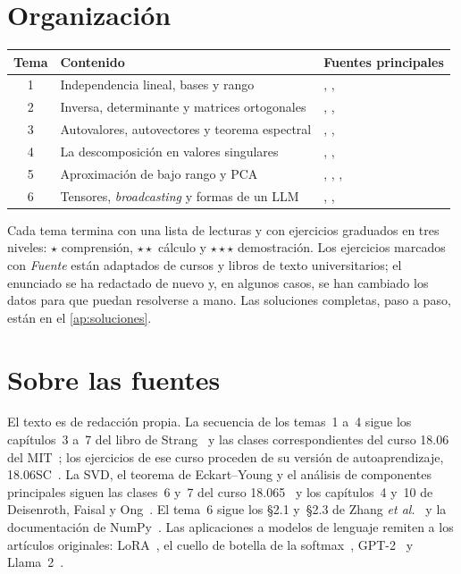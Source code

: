 \documentclass[11pt,a4paper,twoside,openany]{book}
\begin{document}
\section*{Organización}
\begin{center}
\small
\begin{tabular}{@{}cll@{}}
\toprule
Tema & Contenido & Fuentes principales \\
\midrule
1 & Independencia lineal, bases y rango & \cite{strang-ila}, \cite{mit1806}, \cite{mml} \\
2 & Inversa, determinante y matrices ortogonales & \cite{strang-ila}, \cite{mit1806}, \cite{mml} \\
3 & Autovalores, autovectores y teorema espectral & \cite{strang-ila}, \cite{mit1806}, \cite{mml} \\
4 & La descomposición en valores singulares & \cite{strang-ila}, \cite{mit18065}, \cite{mml} \\
5 & Aproximación de bajo rango y PCA & \cite{eckart-young}, \cite{mit18065}, \cite{mml}, \cite{hu-lora} \\
6 & Tensores, \emph{broadcasting} y formas de un LLM & \cite{d2l}, \cite{numpy-bc}, \cite{yang-softmax} \\
\bottomrule
\end{tabular}
\end{center}

Cada tema termina con una lista de lecturas y con ejercicios graduados en tres niveles: $\star$ comprensión, $\star\star$ cálculo y $\star\star\star$ demostración. Los ejercicios marcados con \emph{Fuente} están adaptados de cursos y libros de texto universitarios; el enunciado se ha redactado de nuevo y, en algunos casos, se han cambiado los datos para que puedan resolverse a mano. Las soluciones completas, paso a paso, están en el \cref{ap:soluciones}.

\section*{Sobre las fuentes}
El texto es de redacción propia. La secuencia de los temas~1 a~4 sigue los capítulos~3 a~7 del libro de Strang~\cite{strang-ila} y las clases correspondientes del curso 18.06 del MIT~\cite{mit1806}; los ejercicios de ese curso proceden de su versión de autoaprendizaje, 18.06SC~\cite{mit1806sc}. La SVD, el teorema de Eckart--Young y el análisis de componentes principales siguen las clases~6 y~7 del curso 18.065~\cite{mit18065} y los capítulos~4 y~10 de Deisenroth, Faisal y Ong~\cite{mml}. El tema~6 sigue los §2.1 y~§2.3 de Zhang \emph{et al.}~\cite{d2l} y la documentación de NumPy~\cite{numpy-bc}. Las aplicaciones a modelos de lenguaje remiten a los artículos originales: LoRA~\cite{hu-lora}, el cuello de botella de la softmax~\cite{yang-softmax}, GPT-2~\cite{gpt2} y Llama~2~\cite{llama2}.
\end{document}
